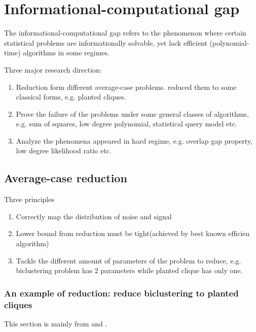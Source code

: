 \section{Informational-computational gap}
The informational-computational gap refers to the phenomenon where certain statistical problems are informationally solvable, yet lack efficient (polynomial-time) algorithms in some regimes.

Three major research direction: 
\begin{enumerate}
    \item Reduction form different average-case problems. reduced them to some classical forms, e.g. planted cliques.
    \item Prove the failure of the problems under some general classes of algorithms, e.g. sum of squares, low degree polynomial, statistical query model etc.
    \item Analyze the phenomena appeared in hard regime, e.g. overlap gap property, low degree likelihood ratio etc.
\end{enumerate}
\subsection{Average-case reduction}
Three principles\cite{brennan2020reducibility}
\begin{enumerate}
    \item Correctly map the distribution of noise and signal
    \item Lower bound from reduction must be tight(achieved by best known efficien algorithm)
    \item Tackle the different amount of parameters of the problem to reduce, e.g. biclustering problem has 2 parameters while planted clique has only one.
\end{enumerate}
\subsubsection{An example of reduction: reduce biclustering to planted cliques}
This section is mainly from \cite{avg_redu_1} and \cite{avg_redu_2}.

